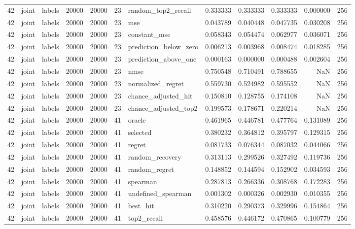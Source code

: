 \begin{tabular}{rllrrrlrrrrr}
42 & joint & labels & 20000 & 20000 & 23 & random_top2_recall & 0.333333 & 0.333333 & 0.333333 & 0.000000 & 256 \\
42 & joint & labels & 20000 & 20000 & 23 & mse & 0.043789 & 0.040448 & 0.047735 & 0.030208 & 256 \\
42 & joint & labels & 20000 & 20000 & 23 & constant_mse & 0.058343 & 0.054474 & 0.062977 & 0.036071 & 256 \\
42 & joint & labels & 20000 & 20000 & 23 & prediction_below_zero & 0.006213 & 0.003968 & 0.008474 & 0.018285 & 256 \\
42 & joint & labels & 20000 & 20000 & 23 & prediction_above_one & 0.000163 & 0.000000 & 0.000488 & 0.002604 & 256 \\
42 & joint & labels & 20000 & 20000 & 23 & nmse & 0.750548 & 0.710491 & 0.788655 & NaN & 256 \\
42 & joint & labels & 20000 & 20000 & 23 & normalized_regret & 0.559730 & 0.524982 & 0.595552 & NaN & 256 \\
42 & joint & labels & 20000 & 20000 & 23 & chance_adjusted_hit & 0.150810 & 0.128755 & 0.174108 & NaN & 256 \\
42 & joint & labels & 20000 & 20000 & 23 & chance_adjusted_top2 & 0.199573 & 0.178671 & 0.220214 & NaN & 256 \\
42 & joint & labels & 20000 & 20000 & 41 & oracle & 0.461965 & 0.446781 & 0.477764 & 0.131089 & 256 \\
42 & joint & labels & 20000 & 20000 & 41 & selected & 0.380232 & 0.364812 & 0.395797 & 0.129315 & 256 \\
42 & joint & labels & 20000 & 20000 & 41 & regret & 0.081733 & 0.076344 & 0.087032 & 0.044066 & 256 \\
42 & joint & labels & 20000 & 20000 & 41 & random_recovery & 0.313113 & 0.299526 & 0.327492 & 0.119736 & 256 \\
42 & joint & labels & 20000 & 20000 & 41 & random_regret & 0.148852 & 0.144594 & 0.152902 & 0.034593 & 256 \\
42 & joint & labels & 20000 & 20000 & 41 & spearman & 0.287813 & 0.266336 & 0.308768 & 0.172283 & 256 \\
42 & joint & labels & 20000 & 20000 & 41 & undefined_spearman & 0.001302 & 0.000326 & 0.002930 & 0.010355 & 256 \\
42 & joint & labels & 20000 & 20000 & 41 & best_hit & 0.310220 & 0.290373 & 0.329996 & 0.154864 & 256 \\
42 & joint & labels & 20000 & 20000 & 41 & top2_recall & 0.458576 & 0.446172 & 0.470865 & 0.100779 & 256 \\

\end{tabular}
